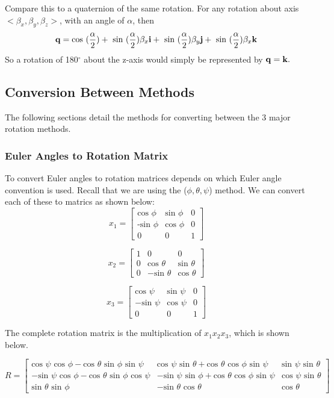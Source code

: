 Compare this to a quaternion of the same rotation.
For any rotation about axis $<\beta_x, \beta_y, \beta_z>$, with an angle of $\alpha$, then $$ \text{\textbf{q}} = \text{cos }(\frac{\alpha}{2}) + \text{ sin }(\frac{\alpha}{2})\beta_x\text{\textbf{i}} + \text{ sin }(\frac{\alpha}{2})\beta_y\text{\textbf{j}} + \text{ sin }(\frac{\alpha}{2}) \beta_x\text{\textbf{k}} $$
So a rotation of 180$^\circ$ about the z-axis would simply be represented by $\text{\textbf{q}} = \text{\textbf{k}}.$

\subsection{Conversion Between Methods}
The following sections detail the methods for converting between the 3 major rotation methods.

\subsubsection{Euler Angles to Rotation Matrix}
To convert Euler angles to rotation matrices depends on which Euler angle convention is used.
Recall that we are using the ($\phi, \theta, \psi$) method.
We can convert each of these to matrics as shown below:
$$
x_1 =
\begin{bmatrix}
\text{cos }\phi & \text{sin } \phi & 0 \\
\text{-sin }\phi & \text{cos }\phi & 0 \\
0 & 0 & 1
\end{bmatrix}
$$

$$
x_2 =
\begin{bmatrix}
1 & 0 & 0 \\
0 & \text{cos } \theta & \text{sin } \theta \\
0 & -\text{sin } \theta & \text{cos } \theta
\end{bmatrix}
$$

$$
x_3 =
\begin{bmatrix}
\text{cos } \psi & \text{sin } \psi & 0 \\
- \text{sin } \psi & \text{cos } \psi & 0 \\
0 & 0 & 1
\end{bmatrix}
$$

The complete rotation matrix is the multiplication of $x_1x_2x_3$, which is shown below.

$$
R =
\begin{bmatrix}
\text{cos }\psi \text{ cos }\phi- \text{cos }\theta \text{ sin }\phi \text{ sin }\psi & \text{cos } \psi \text{ sin }\theta + \text{cos }\theta \text{ cos }\phi \text{ sin }\psi & \text{sin }\psi \text{ sin }\theta \\
-\text{sin }\psi \text{ cos }\phi - \text{cos }\theta \text{ sin }\phi \text{ cos }\psi & - \text{sin }\psi \text{ sin }\phi + \text{cos }\theta \text{ cos }\phi \text{ sin }\psi & \text{cos }\psi \text{ sin }\theta \\
\text{sin }\theta \text{ sin }\phi & - \text{sin }\theta \text{ cos }\theta & \text{cos } \theta
\end{bmatrix}
$$

